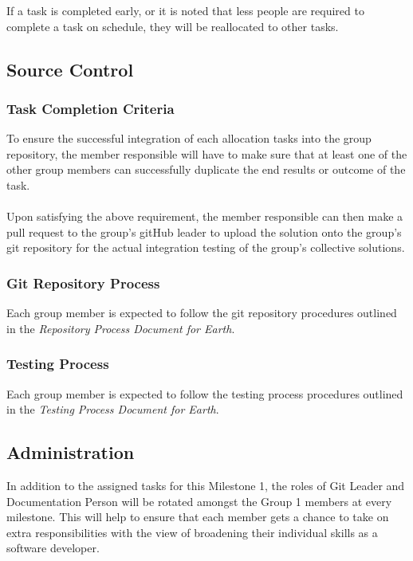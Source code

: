 \documentclass[10pt,a4,oneside]{article}
\begin{document}
If a task is completed early, or it is noted that less people are required to complete a task on schedule, they will be reallocated to other tasks.\\
 

\subsection{Source Control}

\subsubsection{Task Completion Criteria}

\noindent To ensure the successful integration of each allocation tasks into the group repository, the member responsible will have to make sure that at least one of the other group members can successfully duplicate the end results or outcome of the task.

\paragraph{}
\noindent Upon satisfying the above requirement, the member responsible can then make a pull request to the group's gitHub leader to upload the solution onto the group's git repository for the actual integration testing of the group's collective solutions. 


\subsubsection{Git Repository Process}

\noindent Each group member is expected to follow the git repository procedures outlined in the \emph{Repository Process Document for Earth}.
 

\subsubsection{Testing Process}
\noindent Each group member is expected to follow the testing process procedures outlined in the \emph{Testing Process Document for Earth}.


\subsection{Administration}

In addition to the assigned tasks for this Milestone 1, the roles of Git Leader and Documentation Person will be rotated amongst the Group 1 members at every milestone. This will help to ensure that each member gets a chance to take on extra responsibilities with the view of broadening their individual skills as a software developer.
\end{document}
